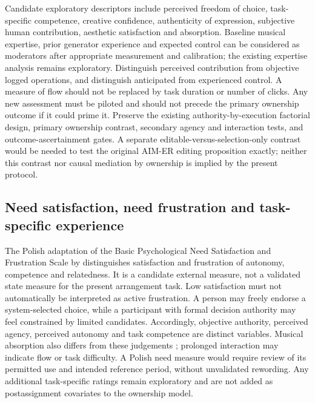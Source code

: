 \documentclass[11pt]{article}
\begin{document}
Candidate exploratory descriptors include perceived freedom of choice, task-specific competence, creative confidence, authenticity of expression, subjective human contribution, aesthetic satisfaction and absorption. Baseline musical expertise, prior generator experience and expected control can be considered as moderators after appropriate measurement and calibration; the existing expertise analysis remains exploratory. Distinguish perceived contribution from objective logged operations, and distinguish anticipated from experienced control. A measure of flow should not be replaced by task duration or number of clicks. Any new assessment must be piloted and should not precede the primary ownership outcome if it could prime it. Preserve the existing authority-by-execution factorial design, primary ownership contrast, secondary agency and interaction tests, and outcome-ascertainment gates. A separate editable-versus-selection-only contrast would be needed to test the original AIM-ER editing proposition exactly; neither this contrast nor causal mediation by ownership is implied by the present protocol.

\subsection{Need satisfaction, need frustration and task-specific experience}
The Polish adaptation of the Basic Psychological Need Satisfaction and Frustration Scale by \citet{kuzma2020} distinguishes satisfaction and frustration of autonomy, competence and relatedness. It is a candidate external measure, not a validated state measure for the present arrangement task. Low satisfaction must not automatically be interpreted as active frustration. A person may freely endorse a system-selected choice, while a participant with formal decision authority may feel constrained by limited candidates. Accordingly, objective authority, perceived agency, perceived autonomy and task competence are distinct variables. Musical absorption also differs from these judgements \citep{chirico2015}; prolonged interaction may indicate flow or task difficulty. A Polish need measure would require review of its permitted use and intended reference period, without unvalidated rewording. Any additional task-specific ratings remain exploratory and are not added as postassignment covariates to the ownership model.
\end{document}
